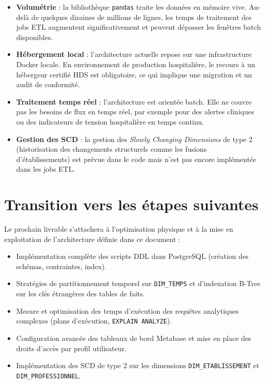 \documentclass[12pt, a4paper]{report}
\begin{document}
\begin{itemize}[label=\textcolor{chuBlue}{\textbullet}]
\begin{itemize}[label=\textcolor{chuBlue}{\textbullet}]
  \item \textbf{Volumétrie} : la bibliothèque \texttt{pandas} traite les données en mémoire vive. Au-delà de quelques dizaines de millions de lignes, les temps de traitement des jobs ETL augmentent significativement et peuvent dépasser les fenêtres batch disponibles.
  \item \textbf{Hébergement local} : l'architecture actuelle repose sur une infrastructure Docker locale. En environnement de production hospitalière, le recours à un hébergeur certifié HDS est obligatoire, ce qui implique une migration et un audit de conformité.
  \item \textbf{Traitement temps réel} : l'architecture est orientée batch. Elle ne couvre pas les besoins de flux en temps réel, par exemple pour des alertes cliniques ou des indicateurs de tension hospitalière en temps continu.
  \item \textbf{Gestion des SCD} : la gestion des \emph{Slowly Changing Dimensions} de type 2 (historisation des changements structurels comme les fusions d'établissements) est prévue dans le code mais n'est pas encore implémentée dans les jobs ETL.
\end{itemize}

\section{Transition vers les étapes suivantes}

\begin{infobox}
Le prochain livrable s'attachera à l'optimisation physique et à la mise en exploitation de l'architecture définie dans ce document :

\begin{itemize}[leftmargin=0.8cm, label=\textcolor{chuBlue}{\textbullet}]
  \item Implémentation complète des scripts DDL dans PostgreSQL (création des schémas, contraintes, index).
  \item Stratégies de partitionnement temporel sur \texttt{DIM\_TEMPS} et d'indexation B-Tree sur les clés étrangères des tables de faits.
  \item Mesure et optimisation des temps d'exécution des requêtes analytiques complexes (plans d'exécution, \texttt{EXPLAIN ANALYZE}).
  \item Configuration avancée des tableaux de bord Metabase et mise en place des droits d'accès par profil utilisateur.
  \item Implémentation des SCD de type 2 sur les dimensions \texttt{DIM\_ETABLISSEMENT} et \texttt{DIM\_PROFESSIONNEL}.
\end{itemize}
\end{infobox}


\end{itemize}
\end{document}
